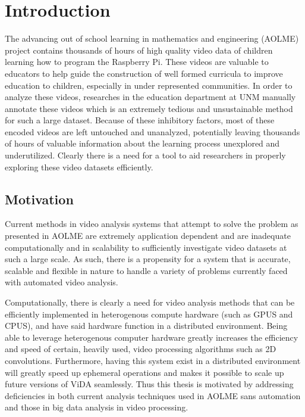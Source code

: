 \chapter{Introduction}
The advancing out of school learning in mathematics and engineering (AOLME)
project contains thousands of hours of high quality video data of children
learning how to program the Raspberry Pi. These videos are valuable to educators
to help guide the construction of well formed curricula to improve education to
children, especially in under represented communities. In order to analyze these
videos, researches in the education department at UNM  manually annotate these
videos which is an extremely tedious and unsustainable method for such a large
dataset. Because of these inhibitory factors, most of these encoded videos are
left untouched and unanalyzed, potentially leaving thousands of hours of
valuable information about the learning process unexplored and  underutilized.
Clearly there is a need for a tool to aid researchers in properly exploring
these video datasets efficiently.

\section{\label{section:motivation}Motivation}

Current methods in video analysis systems that attempt to solve the problem  as
presented in AOLME are extremely application dependent and are inadequate
computationally and in scalability to sufficiently investigate video datasets at such
a large scale. As such, there is a propensity for a system that is accurate,
scalable and flexible in nature to handle a variety of problems currently faced
with automated video analysis.

Computationally, there is clearly a need for video analysis methods that can be
efficiently implemented in heterogenous compute hardware (such as GPUS and
CPUS), and have said hardware function in a distributed environment. Being able
to leverage heterogenous computer hardware greatly increases the efficiency and
speed of certain, heavily used, video processing algorithms such as 2D
convolutions. Furthermore, having this system exist in a distributed environment
will greatly speed up ephemeral operations and makes it possible to scale up
future versions of ViDA seamlessly. Thus this thesis is motivated
by addressing deficiencies in both current analysis techniques used in AOLME sans
automation and those in big data analysis in video processing.

